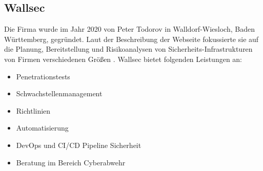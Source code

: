 \subsection{Wallsec}
Die Firma wurde im Jahr 2020 von Peter Todorov in Walldorf-Wiesloch, Baden Württemberg, gegründet. Laut der Beschreibung der Webseite fokussierte sie auf die Planung, Bereitstellung und Risikoanalysen von Sicherheits-Infrastrukturen von Firmen verschiedenen Größen \cite{Wallsec}. Wallsec bietet folgenden Leistungen an:

\begin{itemize}
   \item Penetrationstests
   \item Schwachstellenmanagement
   \item Richtlinien
   \item Automatisierung
   \item DevOps und CI/CD Pipeline Sicherheit
   \item Beratung im Bereich Cyberabwehr
\end{itemize}








